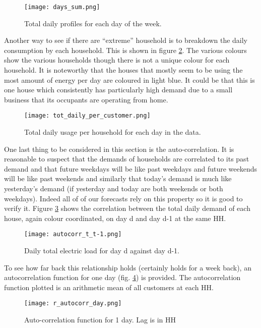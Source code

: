 \documentclass[a4paper]{article}
\begin{document}
\begin{figure}
\centering
\texttt{[image: days\_sum.png]}
\caption{Total daily profiles for each day of the week.}
\label{fig:days} 
\end{figure}

Another way to see if there are ``extreme'' household is to breakdown the daily consumption by each household. This is shown in figure \ref{fig:totes}. The various colours show the various households though there is not a unique colour for each household. It is noteworthy that the houses that mostly seem to be using the most amount of energy per day are coloured in light blue. It could be that this is one house which consistently has particularly high demand due to a small business that its occupants are operating from home.

\begin{figure}
\centering
\texttt{[image: tot\_daily\_per\_customer.png]}
\caption{Total daily usage per household for each day in the data.}
\label{fig:totes}
\end{figure}

One last thing to be considered in this section is the auto-correlation. It is reasonable to suspect that the demands of households are correlated to its past demand and that future weekdays will be like past weekdays and future weekends will be like past weekends and similarly that today's demand is much like yesterday's demand (if yesterday and today are both weekends or both weekdays). Indeed all of of our forecasts rely on this property so it is good to verify it.  Figure \ref{fig:ty_colour} shows the correlation between the total daily demand of each house, again colour coordinated, on day d and day d-1 at the same HH.

\begin{figure}
\centering
\texttt{[image: autocorr\_t\_t-1.png]}
\caption{Daily total electric load for day d against day d-1.}
\label{fig:ty_colour} 
\end{figure}

To see how far back this relationship holds (certainly holds for a week back), an autocorrelation function for one day (fig. \ref{fig:acf_day}) is provided. The autocorrelation function plotted is an arithmetic mean of all customers at each HH.

\begin{figure}
\centering
\texttt{[image: r\_autocorr\_day.png]}
\caption{Auto-correlation function for 1 day. Lag is in HH}
\label{fig:acf_day} 
\end{figure}
\end{document}

